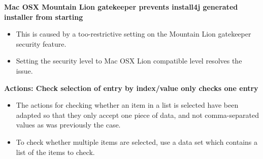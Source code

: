 
\textbf{Mac OSX Mountain Lion gatekeeper prevents install4j generated installer from starting}
\begin{itemize}
\item This is caused by a too-restrictive setting on the Mountain Lion gatekeeper security feature.
\item Setting the security level to Mac OSX Lion compatible level resolves the issue.
\end{itemize}

\textbf{Actions: Check selection of entry by index/value only checks one entry}
\begin{itemize}
\item The actions for checking whether an item in a list is selected have been adapted so that they only accept one piece of data, and not comma-separated values as was previously the case.
\item To check whether multiple items are selected, use a data set which contains a list of the items to check. 
\end{itemize}
